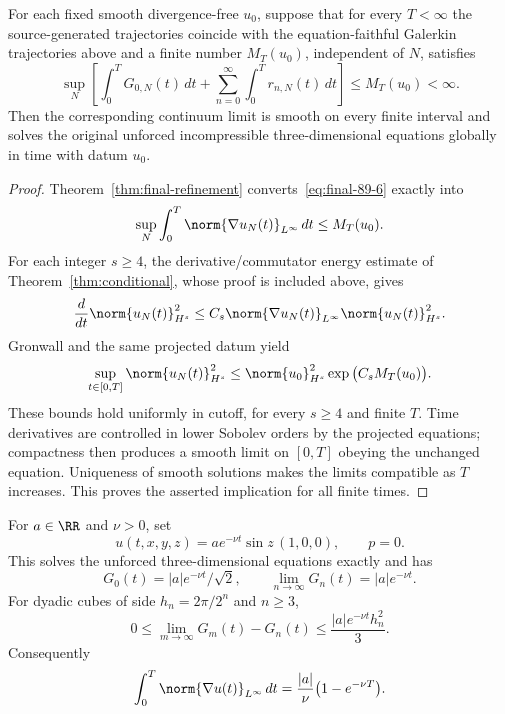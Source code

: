 \begin{theorem}\label{thm:final-source-89}
For each fixed smooth divergence-free $u_0$, suppose that for every $T<\infty$ the source-generated trajectories coincide with the equation-faithful Galerkin trajectories above and a finite number $M_T(u_0)$, independent of $N$, satisfies
\begin{equation}\label{eq:final-89-6}
\boxed{\qquad
\sup_N\left[\int_0^T G_{0,N}(t)\,dt
+\sum_{n=0}^\infty\int_0^T r_{n,N}(t)\,dt\right]\le M_T(u_0)<\infty.\qquad}
\end{equation}
Then the corresponding continuum limit is smooth on every finite interval and solves the original unforced incompressible three-dimensional equations globally in time with datum $u_0$.
\end{theorem}
\begin{proof}
Theorem~\ref{thm:final-refinement} converts~\eqref{eq:final-89-6} exactly into
\[
\sup_N\int_0^T\norm{\nabla u_N(t)}_{L^\infty}\,dt\le M_T(u_0).
\]
For each integer $s\ge4$, the derivative/commutator energy estimate of Theorem~\ref{thm:conditional}, whose proof is included above, gives
\[
\frac{d}{dt}\norm{u_N(t)}_{H^s}^2
\le C_s\norm{\nabla u_N(t)}_{L^\infty}\norm{u_N(t)}_{H^s}^2.
\]
Gronwall and the same projected datum yield
\[
\sup_{t\in[0,T]}\norm{u_N(t)}_{H^s}^2
\le\norm{u_0}_{H^s}^2\exp\big(C_sM_T(u_0)\big).
\]
These bounds hold uniformly in cutoff, for every $s\ge4$ and finite $T$. Time derivatives are controlled in lower Sobolev orders by the projected equations; compactness then produces a smooth limit on $[0,T]$ obeying the unchanged equation. Uniqueness of smooth solutions makes the limits compatible as $T$ increases. This proves the asserted implication for all finite times.
\end{proof}
\begin{proposition}\label{prop:final-shear}
For $a\in\RR$ and $\nu>0$, set
\[
u(t,x,y,z)=a e^{-\nu t}\sin z\,(1,0,0),\qquad p=0.
\]
This solves the unforced three-dimensional equations exactly and has
\[
G_0(t)=|a|e^{-\nu t}/\sqrt 2,\qquad
\lim_{n\to\infty}G_n(t)=|a|e^{-\nu t}.
\]
For dyadic cubes of side $h_n=2\pi/2^n$ and $n\ge3$,
\begin{equation}\label{eq:final-shearerror}
0\le \lim_{m\to\infty}G_m(t)-G_n(t)
\le \frac{|a|e^{-\nu t}h_n^2}{3}.
\end{equation}
Consequently
\[
\int_0^T\norm{\nabla u(t)}_{L^\infty}\,dt
=\frac{|a|}{\nu}\big(1-e^{-\nu T}\big).
\]
\end{proposition}
